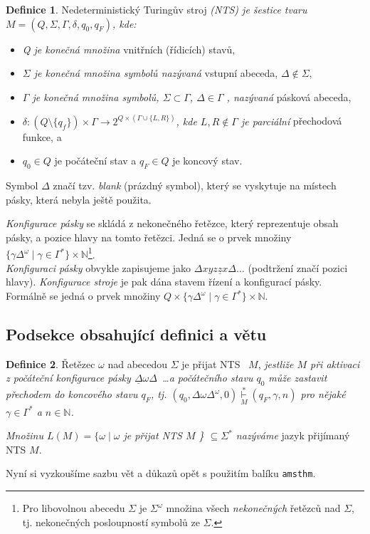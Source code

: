 \documentclass[a4paper, 11pt, twocolumn]{article}
\theoremstyle{definition}
\newtheorem{definition}{Definice}
\theoremstyle{definition}
\begin{document}
\begin{definition}
    
    Nedeterministický Turingův stroj \emph{(NTS) je šestice tvaru $M=(Q,\Sigma,\Gamma,\delta,q_0,q_F)$, kde:}
    \begin{itemize}
        \item \emph{Q je konečná množina} vnitřních (řídicích) stavů,
        \item \emph{$\Sigma$ je konečná množina symbolů nazývaná} vstupní abeceda, $\Delta \notin \Sigma$,
        \item \emph{$\Gamma$ je konečná množina symbolů, $\Sigma \subset \Gamma$, $\Delta \in \Gamma$ , nazývaná} pásková abeceda,
        \item \emph{ $\delta : (Q \setminus \{q_f\}) \times \Gamma \rightarrow 2^{Q\times(\Gamma\cup\{L,R\})}$, kde $L,R \notin \Gamma$ je parciální} přechodová funkce, a
        \item $q_0 \in Q$ je počáteční stav a $q_F \in Q$ je koncový stav.
    \end{itemize}
    
\end{definition}

Symbol $\Delta$ značí tzv. \emph{blank} (prázdný symbol), který se vyskytuje na místech pásky, která nebyla ještě použita.\par
\emph{Konfigurace pásky} se skládá z nekonečného řetězce, který reprezentuje obsah pásky, a pozice hlavy na tomto řetězci. Jedná se o prvek množiny $\{\gamma\Delta^\omega\;|\; \gamma \in \Gamma^*\}\times \mathbb{N}$\footnote{Pro libovolnou abecedu $\Sigma$ je $\Sigma^\omega$ množina všech \emph{nekonečných} řetězců nad $\Sigma$, tj. nekonečných posloupností symbolů ze $\Sigma$.}.\\
\emph{Konfiguraci pásky} obvykle zapisujeme jako ${\Delta xyz\underline{z}x\Delta \dots}$ (podtržení značí pozici hlavy).
\emph{Konfigurace stroje} je pak dána stavem řízení a konfigurací pásky. Formálně se jedná o prvek množiny $Q\times\{\gamma\Delta^\omega\;|\;\gamma \in \Gamma^*\}\times \mathbb{N}$.

\subsection{Podsekce obsahující definici a větu}

\begin{definition}\label{def}
    Řetězec $\omega$ nad abecedou $\Sigma$ je přijat NTS~ $M$, \emph{jestliže $M$ při aktivaci z počáteční konfigurace pásky $\underline{\Delta}\omega\Delta$~\dots a počátečního stavu $q_0$ může zastavit přechodem do koncového stavu $q_F$, tj. $(q_0, \Delta\omega\Delta^\omega,0)\overset{*}{\underset{M}{\vdash}} (q_F,\gamma, n)$ pro nějaké $\gamma \in \Gamma^*$ a $n \in \mathbb{N}$.} \par
    \emph{Množinu $L(M) = \{\omega\; |\; \omega$ je přijat \emph{NTS} $M$ \} $\subseteq \Sigma^*$ nazýváme} jazyk přijímaný NTS $M$.
\end{definition}
Nyní si vyzkoušíme sazbu vět a důkazů opět s použitím balíku \texttt{amsthm}.
\end{document}
